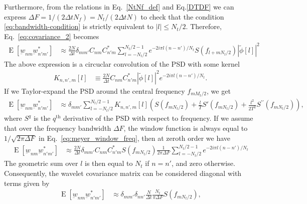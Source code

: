 \documentclass{article}
\begin{document}
Furthermore, from the relations in Eq.~\eqref{NtNf_def} and Eq.\eqref{DTDF} we can express $\Delta F = 1 / (2 \Delta t N_f) = N_t / (2 \Delta t N)$ to check that the condition \eqref{eq:bandwidth-condition} is strictly equivalent to $|l| \leq N_t / 2$. Therefore, Eq.~\eqref{eq:covariance_2} becomes
\begin{align}
\label{eq:covariance_3}
    \operatorname{E}\left[\underbar{w}_{nm} \underbar{w}_{n'm'}^{\ast}\right] & \approx \frac{2 N}{\Delta t} \delta_{m m'} C_{n m}  C_{n' m}^{\ast} \sum_{l=-N_t / 2}^{N_t / 2-1}   e^{-2 i \pi l (n-n') / N_t} S\left(f_{l + m N_t / 2}\right)  | \tilde{\phi}[l] |^{2} 
\end{align}
The above expression is a circuclar convolution of the PSD with some kernel 
\begin{align}
    K_{n, n', m}[l] &  \equiv \frac{2 N}{\Delta t} C_{n m}  C_{n' m}^{\ast} | \tilde{\phi}[l] |^{2}  e^{-2 i \pi l (n-n') / N_t}.
\end{align}
If we Taylor-expand the PSD around the central frequency $f_{m M_t/2}$, we get
\begin{align}
\label{eq:covariance_4}
    \operatorname{E}\left[\underbar{w}_{nm} \underbar{w}_{n'm'}^{\ast}\right] & \approx \delta_{mm'} \sum_{l=-N_t / 2}^{N_t / 2-1}    K_{n, n', m}[l] \left( S\left(f_{m N_t / 2}\right) + \frac{l}{T} S'\left(f_{m N_t / 2}\right)  + \frac{l^2}{2T^2} S^{\prime\prime}\left(f_{m N_t / 2}\right) \right),
\end{align}
where $S^{q}$ is the $q^{\mathrm{th}}$ derivative of the PSD with respect to frequency. If we assume that over the frequency bandwidth $\Delta F$, the window function is always equal to $1/\sqrt{2 \pi \Delta F}$ in Eq.~\eqref{eq:meyer_window_freq}, then at zeroth order we have
\begin{align}
\label{eq:covariance_order_0}
    \operatorname{E}\left[\underbar{w}_{nm} \underbar{w}_{n'm'}^{\ast}\right] & \approx \frac{2 N}{\Delta t} \delta_{m m'} C_{n m}  C_{n' m}^{\ast} S\left(f_{m N_t / 2}\right) \frac{1}{2 \pi \Delta F}  \sum_{l=-N_t / 2}^{N_t / 2-1}   e^{-2 i \pi l (n-n') / N_t} 
\end{align}
The geometric sum over $l$ is then equal to $N_t$ if $n = n'$, and zero otherwise. Consequently, the wavelet covariance matrix can be considered diagonal with terms given by 
\begin{align}
\label{eq:covariance_order_0_diag}
    \operatorname{E}\left[\underbar{w}_{nm} \underbar{w}_{n'm'}^{\ast}\right] & \approx \delta_{m m'} \delta_{n n'}  \frac{N}{\Delta t}\frac{N_t}{\pi \Delta F}  S\left(f_{m N_t / 2}\right) ,
\end{align}
\end{document}
